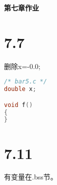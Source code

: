 \documentclass[11pt]{article}
\begin{document}
\begin{center}
  \textbf{\Huge{第七章作业}}
\end{center}

\section*{7.7}
删除x=-0.0;
\begin{lstlisting}[language=c]
/* bar5.c */
double x;

void f()
{
}
\end{lstlisting}

\section*{7.11}
有变量在.bss节。
\end{document}
